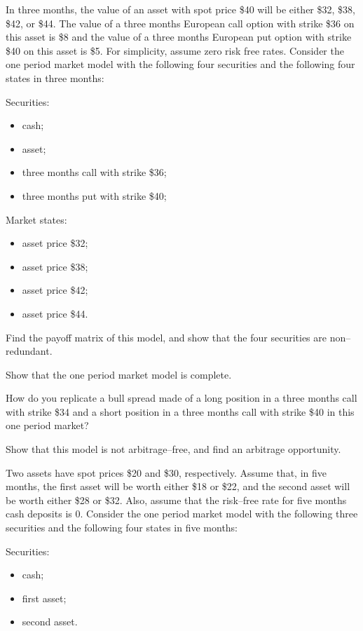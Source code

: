 \begin{exercises}
\item In three months, the value of an asset with spot price \$40 will be
either \$32, \$38, \$42, or \$44. The value of a three months European
call option with strike \$36 on this asset is \$8 and the value of a three
months European put option with strike \$40 on this asset is \$5. For
simplicity, assume zero risk free rates. Consider the one period market
model with the following four securities and the following four states in
three months:

\noindent Securities:
\begin{itemize}
\item cash;
\item asset;
\item three months call with strike \$36;
\item three months put with strike \$40;
\end{itemize}

\noindent Market states:
\begin{itemize}
\item asset price \$32;
\item asset price \$38;
\item asset price \$42;
\item asset price \$44.
\end{itemize}
\begin{subparts}
\item Find the payoff matrix of this model, and show that the four
securities are non--redundant.
\item Show that the one period market model is complete.
\item How do you replicate a bull spread made of a long position in a
three months call with strike \$34 and a short position in a three months
call with strike \$40 in this one period market?
\item Show that this model is not arbitrage--free, and find an arbitrage
opportunity.
\end{subparts}

\item Two assets have spot prices \$20 and \$30, respectively. Assume
that, in five months, the first asset will be worth either \$18 or \$22,
and the second asset will be worth either \$28 or \$32. Also, assume that
the risk--free rate for five months cash deposits is $0$. Consider the one
period market model with the following three securities and the following
four states in five months:

\noindent Securities:
\begin{itemize}
\item cash;
\item first asset;
\item second asset.
\end{itemize}


\end{exercises}
